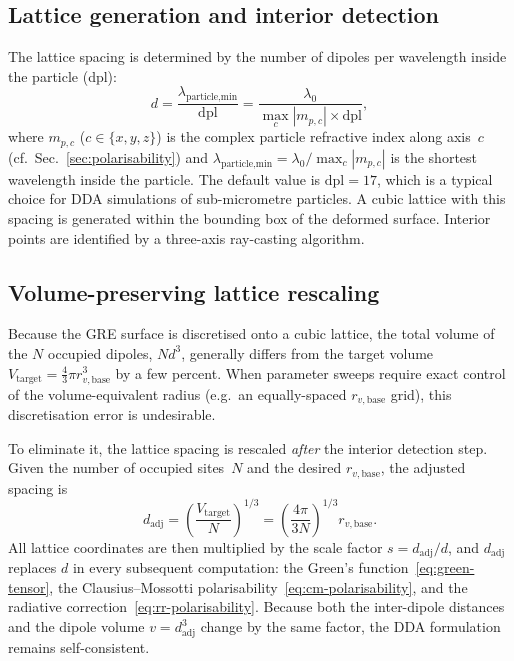 \documentclass[11pt,a4paper]{article}
\begin{document}
\subsection{Lattice generation and interior detection}
\label{sec:interior-detection}

The lattice spacing is determined by the number of dipoles per
wavelength inside the particle (dpl):
\begin{equation}
  d = \frac{\lambda_{\text{particle,min}}}{\mathrm{dpl}}
    = \frac{\lambda_0}{\max_c |m_{p,c}| \times \mathrm{dpl}},
  \label{eq:lattice-spacing}
\end{equation}
where $m_{p,c}$ ($c \in \{x,y,z\}$) is the complex particle
refractive index along axis~$c$ (cf.\ Sec.~\ref{sec:polarisability})
and $\lambda_{\text{particle,min}} = \lambda_0 / \max_c|m_{p,c}|$
is the shortest wavelength inside the particle.
The default value is $\mathrm{dpl} = 17$, which is a typical choice
for DDA simulations of sub-micrometre particles.
A cubic lattice with this spacing is generated within the bounding
box of the deformed surface.
Interior points are identified by a three-axis ray-casting algorithm.

\subsection{Volume-preserving lattice rescaling}
\label{sec:volume-rescaling}

Because the GRE surface is discretised onto a cubic lattice, the
total volume of the $N$ occupied dipoles, $N d^3$, generally differs
from the target volume $V_{\text{target}} = \tfrac{4}{3}\pi r_{v,\text{base}}^3$
by a few percent.  When parameter sweeps require exact control of the
volume-equivalent radius (e.g.\ an equally-spaced $r_{v,\text{base}}$
grid), this discretisation error is undesirable.

To eliminate it, the lattice spacing is rescaled \emph{after} the
interior detection step.  Given the number of occupied sites~$N$ and
the desired $r_{v,\text{base}}$, the adjusted spacing is
\begin{equation}
  d_{\text{adj}}
    = \left(\frac{V_{\text{target}}}{N}\right)^{\!1/3}
    = \left(\frac{4\pi}{3N}\right)^{\!1/3} r_{v,\text{base}}.
  \label{eq:d-adj}
\end{equation}
All lattice coordinates are then multiplied by the scale factor
$s = d_{\text{adj}} / d$, and $d_{\text{adj}}$ replaces $d$ in every
subsequent computation: the Green's function~\eqref{eq:green-tensor},
the Clausius--Mossotti polarisability~\eqref{eq:cm-polarisability},
and the radiative correction~\eqref{eq:rr-polarisability}.
Because both the inter-dipole distances and the dipole volume
$v = d_{\text{adj}}^3$ change by the same factor, the DDA formulation
remains self-consistent.
\end{document}
